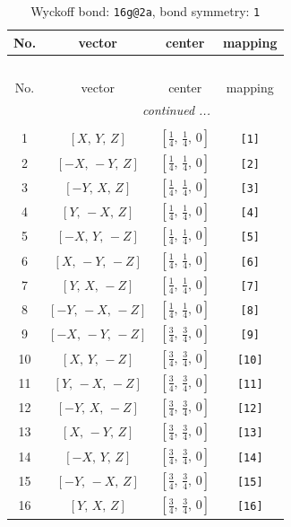 \documentclass[fleqn,8pt]{jsarticle}
\begin{document}
\begin{longtable}{cccc}
\caption{Wyckoff bond: {\tt 16g@2a}, bond symmetry: {\tt 1}}
 \\
 \hline \hline
No. & vector & center & mapping \\ \hline \endfirsthead

\multicolumn{3}{l}{\tablename\ \thetable{}} \\
 \hline \hline
No. & vector & center & mapping \\ \hline \endhead

 \hline \hline
\multicolumn{3}{r}{\footnotesize\it continued ...} \\ \endfoot

 \hline \hline
\multicolumn{3}{r}{} \\ \endlastfoot

1 & $\left[ X,\, Y,\, Z \right]$ & $\left[ \frac{1}{4},\, \frac{1}{4},\, 0 \right]$ & {\tt [1]} \\ \hline
2 & $\left[ - X,\, - Y,\, Z \right]$ & $\left[ \frac{1}{4},\, \frac{1}{4},\, 0 \right]$ & {\tt [2]} \\ \hline
3 & $\left[ - Y,\, X,\, Z \right]$ & $\left[ \frac{1}{4},\, \frac{1}{4},\, 0 \right]$ & {\tt [3]} \\ \hline
4 & $\left[ Y,\, - X,\, Z \right]$ & $\left[ \frac{1}{4},\, \frac{1}{4},\, 0 \right]$ & {\tt [4]} \\ \hline
5 & $\left[ - X,\, Y,\, - Z \right]$ & $\left[ \frac{1}{4},\, \frac{1}{4},\, 0 \right]$ & {\tt [5]} \\ \hline
6 & $\left[ X,\, - Y,\, - Z \right]$ & $\left[ \frac{1}{4},\, \frac{1}{4},\, 0 \right]$ & {\tt [6]} \\ \hline
7 & $\left[ Y,\, X,\, - Z \right]$ & $\left[ \frac{1}{4},\, \frac{1}{4},\, 0 \right]$ & {\tt [7]} \\ \hline
8 & $\left[ - Y,\, - X,\, - Z \right]$ & $\left[ \frac{1}{4},\, \frac{1}{4},\, 0 \right]$ & {\tt [8]} \\ \hline
9 & $\left[ - X,\, - Y,\, - Z \right]$ & $\left[ \frac{3}{4},\, \frac{3}{4},\, 0 \right]$ & {\tt [9]} \\ \hline
10 & $\left[ X,\, Y,\, - Z \right]$ & $\left[ \frac{3}{4},\, \frac{3}{4},\, 0 \right]$ & {\tt [10]} \\ \hline
11 & $\left[ Y,\, - X,\, - Z \right]$ & $\left[ \frac{3}{4},\, \frac{3}{4},\, 0 \right]$ & {\tt [11]} \\ \hline
12 & $\left[ - Y,\, X,\, - Z \right]$ & $\left[ \frac{3}{4},\, \frac{3}{4},\, 0 \right]$ & {\tt [12]} \\ \hline
13 & $\left[ X,\, - Y,\, Z \right]$ & $\left[ \frac{3}{4},\, \frac{3}{4},\, 0 \right]$ & {\tt [13]} \\ \hline
14 & $\left[ - X,\, Y,\, Z \right]$ & $\left[ \frac{3}{4},\, \frac{3}{4},\, 0 \right]$ & {\tt [14]} \\ \hline
15 & $\left[ - Y,\, - X,\, Z \right]$ & $\left[ \frac{3}{4},\, \frac{3}{4},\, 0 \right]$ & {\tt [15]} \\ \hline
16 & $\left[ Y,\, X,\, Z \right]$ & $\left[ \frac{3}{4},\, \frac{3}{4},\, 0 \right]$ & {\tt [16]} \\
\end{longtable}
\end{document}
